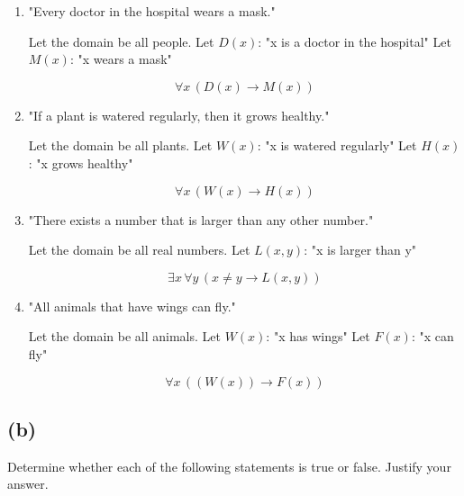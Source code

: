\documentclass{article}
\begin{document}
\begin{enumerate}[label=\roman*.]

\item "Every doctor in the hospital wears a mask."

Let the domain be all people.  
Let \( D(x) \): "x is a doctor in the hospital"  
Let \( M(x) \): "x wears a mask"

\[
\forall x \, (D(x) \to M(x))
\]

\item "If a plant is watered regularly, then it grows healthy."

Let the domain be all plants.  
Let \( W(x) \): "x is watered regularly"  
Let \( H(x) \): "x grows healthy"

\[
\forall x \, (W(x) \to H(x))
\]

\item "There exists a number that is larger than any other number."

Let the domain be all real numbers.  
Let \( L(x, y) \): "x is larger than y"

\[
\exists x \, \forall y \, (x \neq y \to L(x, y))
\]

\item "All animals that have wings can fly."

Let the domain be all animals.  
Let \( W(x) \): "x has wings"  
Let \( F(x) \): "x can fly"

\[
\forall x \, ((W(x)) \to F(x))
\]

\end{enumerate}

\subsection*{(b)}

Determine whether each of the following statements is true or false. Justify your answer.
\end{document}
